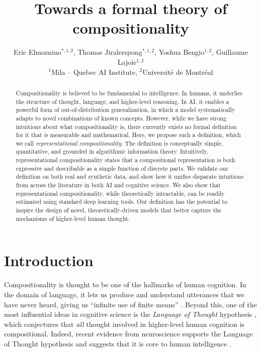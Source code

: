 \documentclass{article} %
\title{Towards a formal theory of compositionality}
\author{
    Eric Elmoznino$^{*,1,2}$, 
    Thomas Jiralerspong$^{*,1,2}$,
    Yoshua Bengio$^{1,2}$,
    Guillaume Lajoie$^{1,2}$  \\
    $^1$Mila -- Quebec AI Institute, 
    $^2$Universit\'e de Montr\'eal
    \vphantom{
    \thanks{Equal contribution. Correspondence to: \texttt{\{eric.elmoznino,guillaume.lajoie\}@mila.quebec}.}
    }
}
\newcommand{\comp}{representational compositionality}
\begin{document}
\maketitle

\begin{abstract}
Compositionality is believed to be fundamental to intelligence. In humans, it underlies the structure of thought, language, and higher-level reasoning. In AI, it enables a powerful form of out-of-distribution generalization, in which a model systematically adapts to novel combinations of known concepts. However, while we have strong intuitions about what compositionality is, there currently exists no formal definition for it that is measurable and mathematical. Here, we propose such a definition, which we call \textit{\comp{}}. The definition is conceptually simple, quantitative, and grounded in algorithmic information theory. Intuitively, \comp{} states that a compositional representation is both expressive and describable as a simple function of discrete parts. We validate our definition on both real and synthetic data, and show how it unifies disparate intuitions from across the literature in both AI and cognitive science. We also show that \comp{}, while theoretically intractable, can be readily estimated using standard deep learning tools. Our definition has the potential to inspire the design of novel, theoretically-driven models that better capture the mechanisms of higher-level human thought.
\end{abstract}


\section{Introduction}

Compositionality is thought to be one of the hallmarks of human cognition. In the domain of language, it lets us produce and understand utterances that we have never heard, giving us ``infinite use of finite means'' \citep{chomsky1956three}. Beyond this, one of the most influential ideas in cognitive science is the \textit{Language of Thought} hypothesis \citep{fodor1975language,quilty2023best}, which conjectures that \emph{all} thought involved in higher-level human cognition is compositional. Indeed, recent evidence from neuroscience supports the Language of Thought hypothesis and suggests that it is core to human intelligence \citep{dehaene_symbols_2022}.
\end{document}
